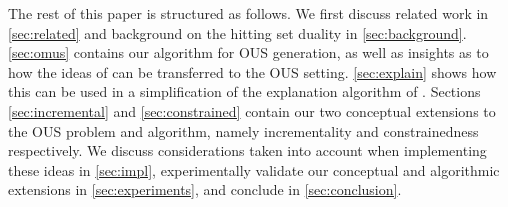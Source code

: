The rest of this paper is structured as follows. We first discuss related work in \cref{sec:related} and background on the hitting set duality in \cref{sec:background}. \cref{sec:omus} contains our algorithm for OUS generation, as well as insights as to how the ideas of \citet{davies} can be transferred to the OUS setting. \cref{sec:explain} shows how this can be used in a simplification of the explanation algorithm of \citet{ecai/BogaertsGCG20}. 
Sections \ref{sec:incremental} and \ref{sec:constrained} contain our two conceptual extensions to the OUS problem and algorithm, namely incrementality and constrainedness respectively. 
We discuss considerations taken into account when implementing these ideas in \cref{sec:impl}, experimentally validate our  conceptual and algorithmic extensions in \cref{sec:experiments}, and conclude in \cref{sec:conclusion}.


